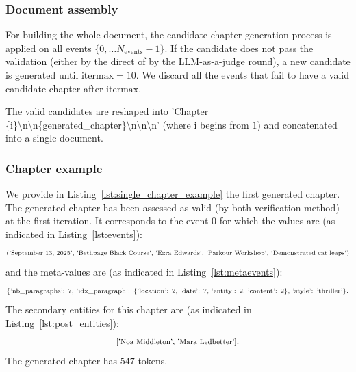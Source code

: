 \documentclass{article}
\begin{document}
\subsubsection{Document assembly}\label{app:1book:docassembly}

For building the whole document, the candidate chapter generation process is applied on all events $\lbrace 0, \ldots N_{\text{events}}-1 \rbrace$. If the candidate does not pass the validation (either by the direct of by the LLM-as-a-judge round), a new candidate is generated until $\text{itermax} = 10$. 
We discard all the events that fail to have a valid candidate chapter after $\text{itermax}$.

The valid candidates are reshaped into 'Chapter \{i\}\textbackslash n\textbackslash n\{generated\_chapter\}\textbackslash n\textbackslash n\textbackslash n' (where i begins from $1$) and concatenated into a single document.

\subsubsection{Chapter example}\label{app:1book:chapterexample}

We provide in Listing~\ref{lst:single_chapter_example} the first generated chapter. The generated chapter has been assessed as valid (by both verification method) at the first iteration. It corresponds to the event $0$ for which the values are (as indicated in Listing~\ref{lst:events}):
$$\scriptsize{\text{('September 13, 2025', 'Bethpage Black Course', 'Ezra Edwards', 'Parkour Workshop', 'Demonstrated cat leaps')}}$$
and the meta-values are (as indicated in Listing~\ref{lst:metaevents}):
$$\scriptsize{\text{\{'nb\_paragraphs': 7, 'idx\_paragraph': \{'location': 2, 'date': 7, 'entity': 2, 'content': 2\}, 'style': 'thriller'\}}}.$$
The secondary entities for this chapter are (as indicated in Listing~\ref{lst:post_entities}):
$$\scriptsize{\text{['Noa Middleton', 'Mara Ledbetter']}}.$$
The generated chapter has $547$ tokens.
\end{document}
